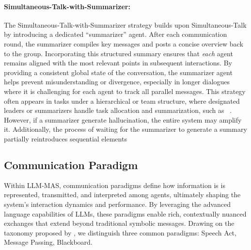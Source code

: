 \paragraph{Simultaneous-Talk-with-Summarizer:}The Simultaneous-Talk-with-Summarizer strategy builds upon Simultaneous-Talk by introducing a dedicated “summarizer” agent. After each communication round, the summarizer compiles key messages and posts a concise overview back to the group. Incorporating this structured summary ensures that \emph{each} agent remains aligned with the most relevant points in subsequent interactions. By providing a consistent global state of the conversation, the summarizer agent helps prevent misunderstanding or divergence, especially in longer dialogues where it is challenging for each agent to track all parallel messages. This strategy often appears in tasks under a hierarchical or team structure, where designated leaders or summarizers handle task allocation and summarization, such as ~\cite{casualgpt_reasoning,social_media_regulation,agentcoord,polca_mas_for_political}. However, if a summarizer generate hallucination, the entire system may amplify it. Additionally, the process of waiting for the summarizer to generate a summary partially reintroduces sequential elements

\subsection{Communication Paradigm}
Within LLM-MAS, communication paradigms define how information is is represented, transmitted, and interpreted among agents, ultimately shaping the system’s interaction dynamics and performance. By leveraging the advanced language capabilities of LLMs, these paradigms enable rich, contextually nuanced exchanges that extend beyond traditional symbolic messages. Drawing on the taxonomy proposed by \cite{mas_a_survey}, we distinguish three common paradigms: Speech Act, Message Passing, Blackboard.

